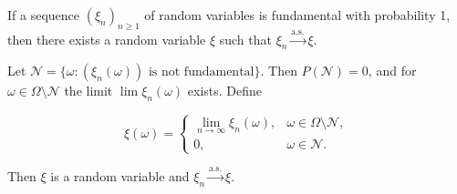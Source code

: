 If a sequence $(\xi_n)_{n \geq 1}$ of random variables is fundamental with probability 1, then there exists a random variable $\xi$ such that $\xi_n \xrightarrow{\text{a.s.}} \xi$.

Let $\mathcal{N} = \{\omega : (\xi_n(\omega)) \text{ is not fundamental}\}$. Then $P(\mathcal{N}) = 0$, and for $\omega \in \Omega \setminus \mathcal{N}$ the limit $\lim \xi_n(\omega)$ exists. Define

$$\xi(\omega) = \begin{cases} \lim_{n \to \infty} \xi_n(\omega), & \omega \in \Omega \setminus \mathcal{N}, \\ 0, & \omega \in \mathcal{N}. \end{cases}$$

Then $\xi$ is a random variable and $\xi_n \xrightarrow{\text{a.s.}} \xi$.
